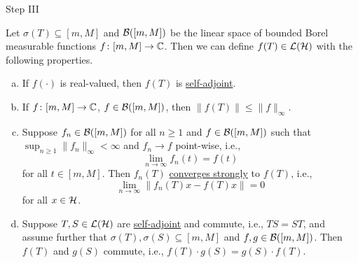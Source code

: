 Step III

Let \(\sigma (T) \subseteq [m, M]\) and \(\mathcal{\MakeUppercase{B}} ([m, M])\) be the linear space of bounded Borel measurable functions \(f\colon [m, M] \to\mathbb{\MakeUppercase{c}}  \). Then we can define \(f(T)\in \mathcal{\MakeUppercase{l}} (\mathcal{\MakeUppercase{h}} )\) with the following properties.
\begin{enumerate}[(a)]
	\item If \(f(\cdot)\) is real-valued, then \(f(T)\) is \hyperref[def:self-adjoint-op]{self-adjoint}.
	\item If \(f\colon [m, M] \to \mathbb{\MakeUppercase{c}} \), \(f\in \mathcal{\MakeUppercase{B}} ([m, M])\), then \(\lVert f(T) \rVert \leq \lVert f \rVert _\infty \).
	\item Suppose \(f_n \in \mathcal{\MakeUppercase{B}} ([m, M])\) for all \(n\geq 1\) and \(f\in \mathcal{\MakeUppercase{B}} ([m, M])\) such that \(\sup _{n\geq 1}\lVert f_n \rVert _\infty < \infty \) and \(f_n \to f\) point-wise, i.e.,
	      \[
		      \lim_{n \to \infty} f_n(t) = f(t)
	      \]
	      for all \(t\in [m, M]\). Then \(f_n(T)\) \hyperref[def:strongly-convergence]{converges strongly} to \(f(T)\), i.e.,
	      \[
		      \lim_{n \to \infty} \lVert f_n(T) x - f(T) x \rVert = 0
	      \]
	      for all \(x\in \mathcal{\MakeUppercase{h}} \).
	\item Suppose \(T, S \in \mathcal{\MakeUppercase{l}} (\mathcal{\MakeUppercase{h}} )\) are \hyperref[def:self-adjoint-op]{self-adjoint} and commute, i.e., \(TS = ST\), and assume further that \(\sigma (T), \sigma (S) \subseteq [m, M]\) and \(f, g\in \mathcal{\MakeUppercase{b}} ([m, M])\). Then \(f(T)\) and \(g(S)\) commute, i.e., \(f(T) \cdot g(S) = g(S) \cdot f(T)\).
\end{enumerate}
